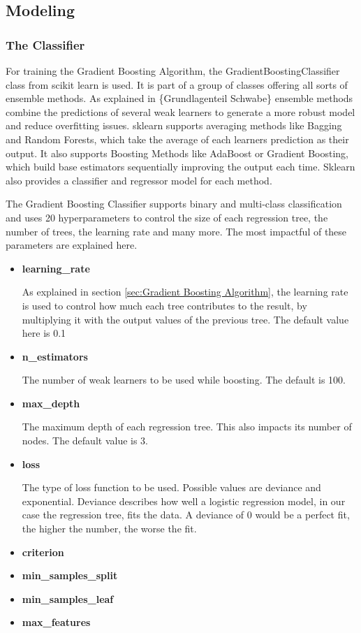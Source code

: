 \subsection{Modeling}

\subsubsection{The Classifier}

For training the Gradient Boosting Algorithm, the GradientBoostingClassifier class from 
scikit learn is used. It is part of a group of classes offering all sorts of ensemble methods.
As explained in \{Grundlagenteil Schwabe\} ensemble methods combine the predictions of several
weak learners to generate a more robust model and reduce overfitting issues.
sklearn supports averaging methods like Bagging and Random Forests, which take the average of each learners prediction
as their output. It also supports Boosting Methods like AdaBoost or Gradient Boosting, which
build base estimators sequentially improving the output each time. Sklearn also provides 
a classifier and regressor model for each method.

The Gradient Boosting Classifier supports binary and multi-class classification and uses
20 hyperparameters to control the size of each regression tree, the number of trees,
the learning rate and many more. The most impactful of these parameters are explained here.

\begin{itemize}
    \item \textbf{learning\_rate}
    
    As explained in section \ref{sec:Gradient Boosting Algorithm}, the learning rate is used to control how
    much each tree contributes to the result, by multiplying it with the output values of the previous 
    tree. The default value here is 0.1
    \item \textbf{n\_estimators}

    The number of weak learners to be used while boosting. The default is 100.
    \item \textbf{max\_depth}

    The maximum depth of each regression tree. This also impacts its number of nodes.
    The default value is 3.
    \item \textbf{loss}

    The type of loss function to be used. Possible values are deviance and exponential.
    Deviance describes how well a logistic regression model, in our case the regression tree,
    fits the data. A deviance of 0 would be a perfect fit, the higher the number, the worse the fit.


    \item \textbf{criterion}
    \item \textbf{min\_samples\_split}
    \item \textbf{min\_samples\_leaf}
    \item \textbf{max\_features}
\end{itemize}

